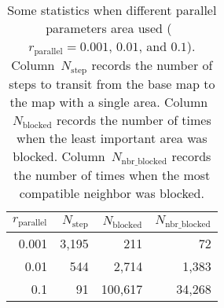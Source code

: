 \documentclass[]{interact}
\begin{document}
\begin{table}[tb]
\centering
\caption{Some statistics when different parallel parameters area used 
    (\ie~$r_\mathrm{parallel}=0.001$, $0.01$, and $0.1$).
    Column~$N_\mathrm{step}$ records the number of steps to transit 
    from the base map to the map with a single area.    
    Column~$N_\mathrm{blocked}$ records the number of times
    when the least important area was blocked.
    Column~$N_\mathrm{nbr\_blocked}$ records the number of times 
    when the most compatible neighbor was blocked.
}
\begin{tabular}{rrrr}
\toprule
$r_\mathrm{parallel}$   & $N_\mathrm{step}$ & $N_\mathrm{blocked}$  & $N_\mathrm{nbr\_blocked}$ \\ \midrule
0.001                   &  3{,}195          &       211             &       72                  \\
0.01                    &  544              &   2{,}714             &  1{,}383                  \\
0.1                     &  91               & 100{,}617             & 34{,}268                  \\ 
\bottomrule 
\end{tabular}
\label{tbl:parallel_param_comparison}
\end{table}
\end{document}
